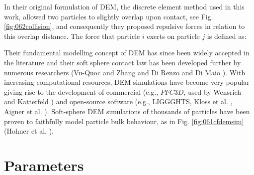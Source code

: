 In their original formulation of \acs{DEM}, the discrete element method used in
this work, \citet{RefWorks:172} allowed two particles to slightly overlap upon
contact, see Fig. \ref{fig:062collision}, and consequently they proposed
repulsive forces in relation to this overlap distance.
The force that particle $i$ exerts on particle $j$ is defined as:


Their fundamental modelling concept of \acs{DEM} has
since been widely accepted in the literature and their soft sphere contact law has been developed further by
numerous researchers (Vu-Quoc and Zhang \cite{RefWorks:148} and Di Renzo and Di Maio \cite{RefWorks:145}). 
With increasing computational resources, \acs{DEM} simulations have become very
popular giving rise to the development of commercial (e.g., $PFC3D$, used by
Wensrich and Katterfeld \cite{RefWorks:87}) and open-source software (e.g.,
\acs{LIGGGHTS}, Kloss et al. \cite{RefWorks:136}, Aigner et al. \cite{RefWorks:139}).
Soft-sphere \acs{DEM} simulations of thousands of particles have been proven to 
faithfully model particle bulk behaviour, as in Fig. \ref{fig:061cfdemsim}
(Hohner et al. \cite{RefWorks:86}).\\
 

\section{Parameters}
\label{sec:parameters}

